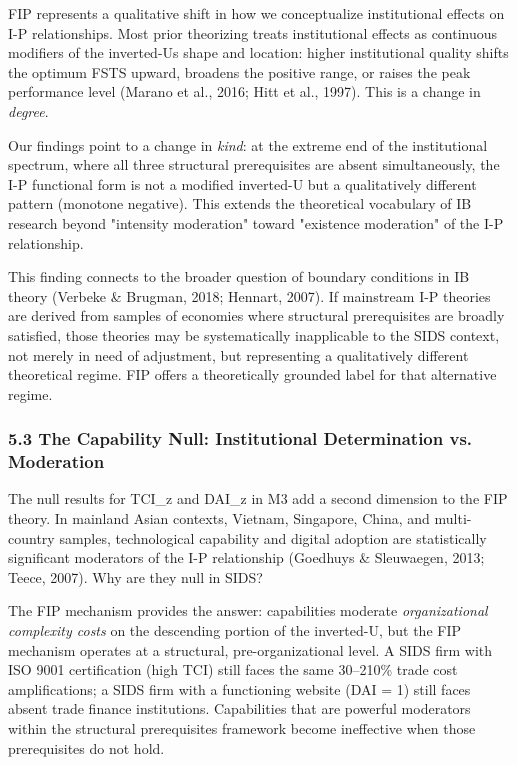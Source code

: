\documentclass[12pt,a4paper]{article}
\begin{document}
FIP represents a qualitative shift in how we conceptualize institutional
effects on I-P relationships. Most prior theorizing treats institutional
effects as continuous modifiers of the inverted-U\textquotesingle s
shape and location: higher institutional quality shifts the optimum FSTS
upward, broadens the positive range, or raises the peak performance
level (Marano et al., 2016; Hitt et al., 1997). This is a change in
\emph{degree}.

Our findings point to a change in \emph{kind}: at the extreme end of the
institutional spectrum, where all three structural prerequisites are
absent simultaneously, the I-P functional form is not a modified
inverted-U but a qualitatively different pattern (monotone negative).
This extends the theoretical vocabulary of IB research beyond "intensity
moderation" toward "existence moderation" of the I-P relationship.

This finding connects to the broader question of boundary conditions in
IB theory (Verbeke \& Brugman, 2018; Hennart, 2007). If mainstream I-P
theories are derived from samples of economies where structural
prerequisites are broadly satisfied, those theories may be
systematically inapplicable to the SIDS context, not merely in need of
adjustment, but representing a qualitatively different theoretical
regime. FIP offers a theoretically grounded label for that alternative
regime.

\hypertarget{53-the-capability-null-institutional-determination-vs-moderation}{%
\subsubsection{5.3 The Capability Null: Institutional Determination vs.
Moderation}\label{53-the-capability-null-institutional-determination-vs-moderation}}

The null results for TCI\_z and DAI\_z in M3 add a second dimension to
the FIP theory. In mainland Asian contexts, Vietnam, Singapore, China,
and multi-country samples, technological capability and digital adoption
are statistically significant moderators of the I-P relationship
(Goedhuys \& Sleuwaegen, 2013; Teece, 2007). Why are they null in SIDS?

The FIP mechanism provides the answer: capabilities moderate
\emph{organizational complexity costs} on the descending portion of the
inverted-U, but the FIP mechanism operates at a structural,
pre-organizational level. A SIDS firm with ISO 9001 certification (high
TCI) still faces the same 30--210\% trade cost amplifications; a SIDS
firm with a functioning website (DAI = 1) still faces absent trade
finance institutions. Capabilities that are powerful moderators within
the structural prerequisites framework become ineffective when those
prerequisites do not hold.
\end{document}
